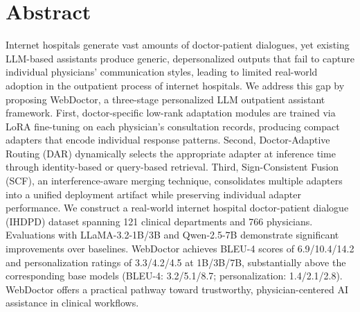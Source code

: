 ﻿\section*{Abstract}

Internet hospitals generate vast amounts of doctor-patient dialogues, yet existing LLM-based assistants produce generic, depersonalized outputs that fail to capture individual physicians' communication styles, leading to limited real-world adoption in the outpatient process of internet hospitals. We address this gap by proposing WebDoctor, a three-stage personalized LLM outpatient assistant framework. First, doctor-specific low-rank adaptation modules are trained via LoRA fine-tuning on each physician's consultation records, producing compact adapters that encode individual response patterns. Second, Doctor-Adaptive Routing (DAR) dynamically selects the appropriate adapter at inference time through identity-based or query-based retrieval. Third, Sign-Consistent Fusion (SCF), an interference-aware merging technique, consolidates multiple adapters into a unified deployment artifact while preserving individual adapter performance. We construct a real-world internet hospital doctor-patient dialogue (IHDPD) dataset spanning 121 clinical departments and 766 physicians. Evaluations with LLaMA-3.2-1B/3B and Qwen-2.5-7B demonstrate significant improvements over baselines. WebDoctor achieves BLEU-4 scores of 6.9/10.4/14.2 and personalization ratings of 3.3/4.2/4.5 at 1B/3B/7B, substantially above the corresponding base models (BLEU-4: 3.2/5.1/8.7; personalization: 1.4/2.1/2.8). WebDoctor offers a practical pathway toward trustworthy, physician-centered AI assistance in clinical workflows.




\clearpage
{}
\linenumbers


